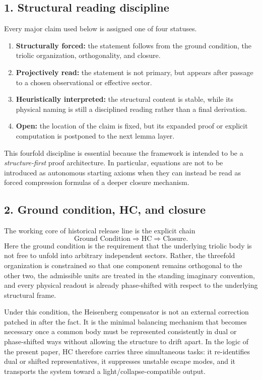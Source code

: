 \documentclass[12pt,a4paper]{article}
\DeclareRobustCommand{\QSCver}[1]{archival stage}
\renewcommand{\QSCver}[1]{historical release line}
\begin{document}
\subsection*{1. Structural reading discipline}
Every major claim used below is assigned one of four statuses.
\begin{enumerate}[leftmargin=2em,label=(\alph*)]
 \item \textbf{Structurally forced:} the statement follows from the ground
 condition, the triolic organization, orthogonality, and closure.
 \item \textbf{Projectively read:} the statement is not primary, but appears
 after passage to a chosen observational or effective sector.
 \item \textbf{Heuristically interpreted:} the structural content is stable,
 while its physical naming is still a disciplined reading rather than a final
 derivation.
 \item \textbf{Open:} the location of the claim is fixed, but its expanded
 proof or explicit computation is postponed to the next lemma layer.
\end{enumerate}

This fourfold discipline is essential because the framework is intended to be a
\emph{structure-first} proof architecture. In particular, equations are not to
be introduced as autonomous starting axioms when they can instead be read as
forced compression formulas of a deeper closure mechanism.

\subsection*{2. Ground condition, HC, and closure}
The working core of \QSCver{v1.2.0} is the explicit chain
\[
\text{Ground Condition} \Longrightarrow \text{HC} \Longrightarrow \text{Closure}.
\]
Here the ground condition is the requirement that the underlying triolic body is
not free to unfold into arbitrary independent sectors. Rather, the threefold
organization is constrained so that one component remains orthogonal to the
other two, the admissible units are treated in the standing imaginary
convention, and every physical readout is already phase-shifted with respect to
the underlying structural frame.

Under this condition, the Heisenberg compensator is not an external correction
patched in after the fact. It is the minimal balancing mechanism that becomes
necessary once a common body must be represented consistently in dual or
phase-shifted ways without allowing the structure to drift apart. In the logic
of the present paper, HC therefore carries three simultaneous tasks: it
re-identifies dual or shifted representatives, it suppresses unstable escape
modes, and it transports the system toward a light/collapse-compatible output.
\end{document}
